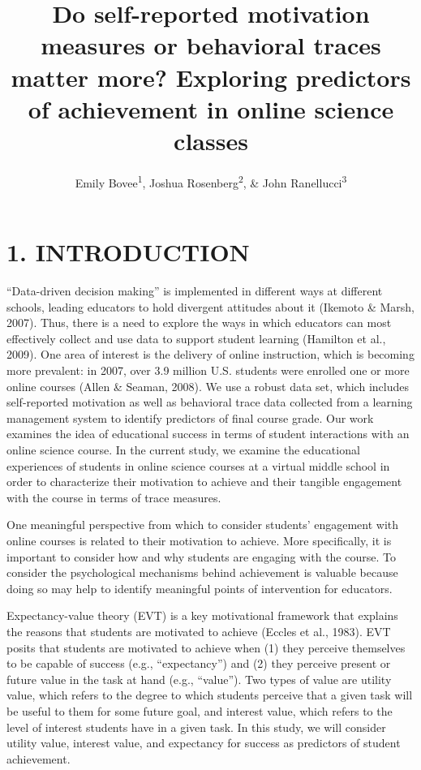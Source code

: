 \documentclass[acmart]{apa6}
\title{Do self-reported motivation measures or behavioral traces matter more?
Exploring predictors of achievement in online science classes}
\author{Emily Bovee\textsuperscript{1}, Joshua Rosenberg\textsuperscript{2}, \& John Ranellucci\textsuperscript{3}}
\affiliation{
    \vspace{0.5cm}
          \textsuperscript{1} Michigan State University\\
          \textsuperscript{2} University of Tennessee, Knoxville\\
          \textsuperscript{3} Hunter College  }
\theoremstyle{definition}
\theoremstyle{definition}
\theoremstyle{definition}
\theoremstyle{remark}
\begin{document}
\maketitle

\setcounter{secnumdepth}{0}



\section{1. INTRODUCTION}\label{introduction}

\enquote{Data-driven decision making} is implemented in different ways
at different schools, leading educators to hold divergent attitudes
about it (Ikemoto \& Marsh, 2007). Thus, there is a need to explore the
ways in which educators can most effectively collect and use data to
support student learning (Hamilton et al., 2009). One area of interest
is the delivery of online instruction, which is becoming more prevalent:
in 2007, over 3.9 million U.S. students were enrolled one or more online
courses (Allen \& Seaman, 2008). We use a robust data set, which
includes self-reported motivation as well as behavioral trace data
collected from a learning management system to identify predictors of
final course grade. Our work examines the idea of educational success in
terms of student interactions with an online science course. In the
current study, we examine the educational experiences of students in
online science courses at a virtual middle school in order to
characterize their motivation to achieve and their tangible engagement
with the course in terms of trace measures.

One meaningful perspective from which to consider students' engagement
with online courses is related to their motivation to achieve. More
specifically, it is important to consider how and why students are
engaging with the course. To consider the psychological mechanisms
behind achievement is valuable because doing so may help to identify
meaningful points of intervention for educators.

Expectancy-value theory (EVT) is a key motivational framework that
explains the reasons that students are motivated to achieve (Eccles et
al., 1983). EVT posits that students are motivated to achieve when (1)
they perceive themselves to be capable of success (e.g.,
\enquote{expectancy}) and (2) they perceive present or future value in
the task at hand (e.g., \enquote{value}). Two types of value are utility
value, which refers to the degree to which students perceive that a
given task will be useful to them for some future goal, and interest
value, which refers to the level of interest students have in a given
task. In this study, we will consider utility value, interest value, and
expectancy for success as predictors of student achievement.
\end{document}
